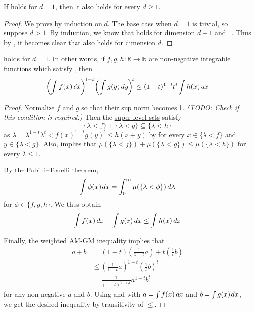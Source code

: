 \begin{corollary}
    If  holds for $d=1$, then it also holds for every $d\geq 1$.
\end{corollary}
\begin{proof}
    We prove by induction on $d$.
    The base case when $d=1$ is trivial, so suppose $d>1$.
    By induction, we know that  holds for dimension $d-1$ and $1$.
    Thus by , it becomes clear that  also holds for dimension $d$.
\end{proof}

\begin{lemma}
     holds for $d=1$. In other words,
    if $f,g,h:\mathbb{R}\to\mathbb{R}$ are non-negative integrable functions which satisfy ,
    then
    \[\biggl( \int f(x) \mathop{d\!} x \biggr)^{\!1-t} \biggl( \int g(y) \mathop{d\!} y \biggr)^{\!t} \le (1-t)^{1-t} t^{t} \int h(x) \mathop{d\!} x\]
\end{lemma}
\begin{proof}
    Normalize $f$ and $g$ so that their sup norm becomes 1.
    \textit{(TODO: Check if this condition is required.)}
    Then the \href{https://en.wikipedia.org/wiki/Level_set}{super-level sets} satisfy
    \[\{\lambda<f\}+\{\lambda<g\}\subseteq\{\lambda<h\}\]
    as $\lambda=\lambda^{1-t}\lambda^{t}<f(x)^{1-t}g(y)^{t}\leq h(x+y)$ by  for every $x\in \{\lambda<f\}$ and $y\in\{\lambda<g\}$.
    Also,  implies that $\mu(\{\lambda<f\})+\mu(\{\lambda<g\})\leq\mu(\{\lambda<h\})$ for every $\lambda\leq 1$.

    By the Fubini--Tonelli theorem,
    \[\int\phi(x)\mathop{d\!} x=\int_{0}^{\infty}\mu(\{\lambda<\phi\})\mathop{d\!} \lambda\]
    for $\phi\in\{f,g,h\}$.
    We thus obtain
    \begin{equation}
        \label{claim:int-ineq}
        \int f(x)\mathop{d\!} x+\int g(x)\mathop{d\!} x\leq \int h(x)\mathop{d\!} x
    \end{equation}

    Finally, the weighted AM-GM inequality implies that
    \begin{equation}
        \label{claim:am-gm-coro}
        \begin{split}
            a+b
            &=(1-t)\left(\frac{1}{1-t}a\right)+t\left(\frac{1}{t}b\right)\\
            &\leq\left(\frac{1}{1-t}a\right)^{1-t}\left(\frac{1}{t}b\right)^{t}\\
            &=\frac{1}{(1-t)^{1-t}t^{t}}a^{1-t}b^{t}
        \end{split}
    \end{equation}
    for any non-negative $a$ and $b$.
    Using  and  with $a=\int f(x)\mathop{d\!} x$ and $b=\int g(x)\mathop{d\!} x$, we get the desired inequality by transitivity of $\leq$.
\end{proof}
